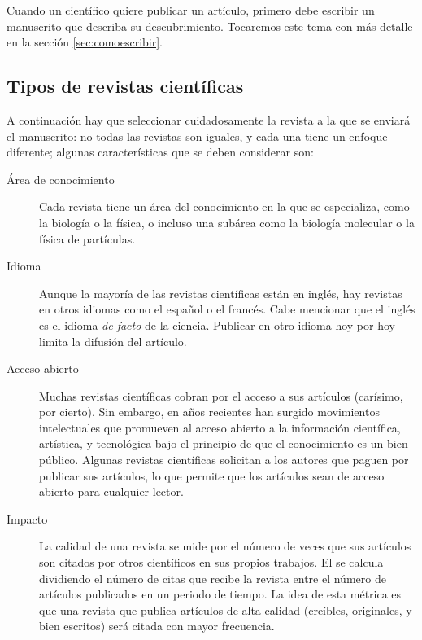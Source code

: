 Cuando un científico quiere publicar un artículo, primero debe escribir un
manuscrito que describa su descubrimiento.
Tocaremos este tema con más detalle en la sección \ref{sec:comoescribir}.

\subsection*{Tipos de revistas científicas}
A continuación hay que seleccionar cuidadosamente la revista a la que se enviará
el manuscrito: no todas las revistas son iguales, y cada una tiene un enfoque
diferente; algunas características que se deben considerar son:

\begin{description}
    \item[Área de conocimiento] Cada revista tiene un área del conocimiento en
        la que se especializa, como la biología o la física, o incluso una
        subárea como la biología molecular o la física de partículas.
    \item[Idioma] Aunque la mayoría de las revistas científicas están en inglés,
        hay revistas en otros idiomas como el español o el francés.
        Cabe mencionar que el inglés es el idioma \emph{de facto} de la
        ciencia.
        Publicar en otro idioma hoy por hoy limita la difusión del artículo.
    \item[Acceso abierto] Muchas revistas científicas cobran por el acceso a sus
        artículos (carísimo, por cierto).
        Sin embargo, en años recientes han surgido movimientos intelectuales
        que promueven al acceso abierto a la información científica, artística,
        y tecnológica bajo el principio de que el conocimiento es un bien
        público.
        Algunas revistas científicas solicitan a los autores que paguen por
        publicar sus artículos, lo que permite que los artículos sean de acceso
        abierto para cualquier lector.
    \item[Impacto] La calidad de una revista se mide por el número de veces que
        sus artículos son citados por otros científicos en sus propios trabajos.
        El  se calcula dividiendo el número de
        citas que recibe la revista entre el número de artículos publicados en
        un periodo de tiempo.
        La idea de esta métrica es que una revista que publica artículos de alta
        calidad (creíbles, originales, y bien escritos) será citada con mayor
        frecuencia.
\end{description}

